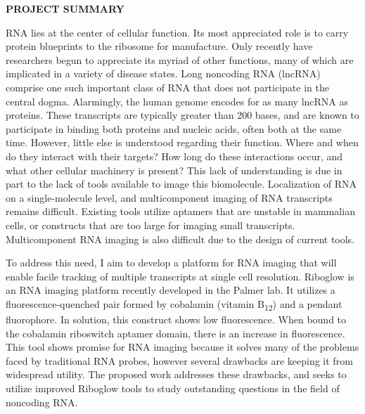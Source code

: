 \documentclass{F32}
\begin{document}
\begin{center}
{\bf PROJECT SUMMARY}
\end{center}

RNA lies at the center of cellular function. Its most appreciated role is to carry protein blueprints to the ribosome for manufacture.
Only recently have researchers begun to appreciate its myriad of other functions, many of which are implicated in a variety of disease states.
Long noncoding RNA (lncRNA) comprise one such important class of RNA that does not participate in the central dogma. Alarmingly, the human genome encodes for as many lncRNA as proteins.
These transcripts are typically greater than 200 bases, and are known to participate in binding both proteins and nucleic acids, often both at the same time.
However, little else is understood regarding their function.
Where and when do they interact with their targets?
How long do these interactions occur, and what other cellular machinery is present?
This lack of understanding is due in part to the lack of tools available to image this biomolecule. Localization of RNA on a single-molecule level, and multicomponent imaging of RNA transcripts remains difficult. Existing tools utilize aptamers that are unstable in mammalian cells, or constructs that are too large for imaging small transcripts. Multicomponent RNA imaging is also difficult due to the design of current tools.

To address this need, I aim to develop a platform for RNA imaging that will enable facile tracking of multiple transcripts at single cell resolution. Riboglow is an RNA imaging platform recently developed in the Palmer lab. It utilizes a fluorescence-quenched pair formed by cobalamin (vitamin B\textsubscript{12}) and a pendant fluorophore. In solution, this construct shows low fluorescence. When bound to the cobalamin riboswitch aptamer domain, there is an increase in fluorescence. This tool shows promise for RNA imaging because it solves many of the problems faced by traditional RNA probes, however several drawbacks are keeping it from widespread utility. The proposed work addresses these drawbacks, and seeks to utilize improved Riboglow tools to study outstanding questions in the field of noncoding RNA.
\end{document}
